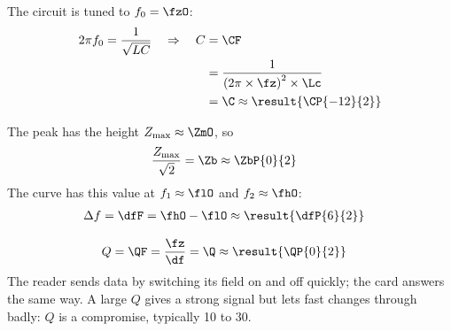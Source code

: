 \begin{abcliste}
\abc The circuit is tuned to $f_0 = \fzO$:
\begin{align}
 2\pi f_0 = \frac{1}{\sqrt{L C}} \quad\Rightarrow\quad C &= \CF \\
   &= \frac{1}{\left(2\pi\times\fz\right)^2\times\Lc} \\
   &= \C \approx \result{\CP{-12}{2}}
\end{align}

\abc The peak has the height $Z_\mathrm{max} \approx \ZmO$, so
\begin{align}
 \frac{Z_\mathrm{max}}{\sqrt{2}} &= \Zb \approx \ZbP{0}{2}
\end{align}
The curve has this value at $f_1 \approx \flO$ and $f_2 \approx \fhO$:
\begin{align}
 \Delta f &= \dfF = \fhO - \flO \approx \result{\dfP{6}{2}}
\end{align}

\abc
\begin{align}
 Q &= \QF = \frac{\fz}{\df} = \Q \approx \result{\QP{0}{2}}
\end{align}
The reader sends data by switching its field on and off quickly; the card answers the same way. A large $Q$ gives a strong signal but lets fast changes through badly: $Q$ is a compromise, typically 10 to 30.
\end{abcliste}
